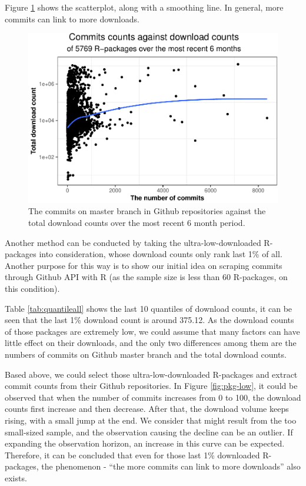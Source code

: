 \documentclass[
]{book}
\begin{document}
Figure \ref{fig:commits-pattern} shows the scatterplot, along with a smoothing line. In general, more commits can link to more downloads.



\begin{figure}

{\centering \includegraphics{figures/commits-pattern-1} 

}

\caption{The commits on master branch in Github repositories against the total download counts over the most recent 6 month period.}\label{fig:commits-pattern}
\end{figure}

Another method can be conducted by taking the ultra-low-downloaded R-packages into consideration, whose download counts only rank last 1\% of all. Another purpose for this way is to show our initial idea on scraping commits through Github API with R (as the sample size is less than 60 R-packages, on this condition).

Table \ref{tab:quantileall} shows the last 10 quantiles of download counts, it can be seen that the last 1\% download count is around 375.12. As the download counts of those packages are extremely low, we could assume that many factors can have little effect on their downloads, and the only two differences among them are the numbers of commits on Github master branch and the total download counts.

Based above, we could select those ultra-low-downloaded R-packages and extract commit counts from their Github repositories. In Figure \ref{fig:pkg-low}, it could be observed that when the number of commits increases from 0 to 100, the download counts first increase and then decrease. After that, the download volume keeps rising, with a small jump at the end. We consider that might result from the too small-sized sample, and the observation causing the decline can be an outlier. If expanding the observation horizon, an increase in this curve can be expected. Therefore, it can be concluded that even for those last 1\% downloaded R-packages, the phenomenon - ``the more commits can link to more downloads'' also exists.
\end{document}
